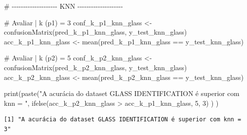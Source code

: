 \documentclass[
  letterpaper,
  DIV=11,
  numbers=noendperiod]{scrartcl}
\newenvironment{Shaded}{\begin{snugshade}}{\end{snugshade}}
\newcommand{\CommentTok}[1]{\textcolor[rgb]{0.37,0.37,0.37}{#1}}
\newcommand{\DecValTok}[1]{\textcolor[rgb]{0.68,0.00,0.00}{#1}}
\newcommand{\FunctionTok}[1]{\textcolor[rgb]{0.28,0.35,0.67}{#1}}
\newcommand{\NormalTok}[1]{\textcolor[rgb]{0.00,0.23,0.31}{#1}}
\newcommand{\OtherTok}[1]{\textcolor[rgb]{0.00,0.23,0.31}{#1}}
\newcommand{\SpecialCharTok}[1]{\textcolor[rgb]{0.37,0.37,0.37}{#1}}
\newcommand{\StringTok}[1]{\textcolor[rgb]{0.13,0.47,0.30}{#1}}
\begin{document}
\begin{Shaded}
\begin{Highlighting}[]
\CommentTok{\# {-}{-}{-}{-}{-}{-}{-}{-}{-}{-}{-}{-}{-}{-}{-}{-}{-}{-}{-}{-} KNN {-}{-}{-}{-}{-}{-}{-}{-}{-}{-}{-}{-}{-}{-}{-}{-}{-}{-}{-}{-}}

\CommentTok{\# Avaliar | k (p1) = 3}
\NormalTok{conf\_k\_p1\_knn\_glass }\OtherTok{\textless{}{-}} \FunctionTok{confusionMatrix}\NormalTok{(pred\_k\_p1\_knn\_glass, y\_test\_knn\_glass)}
\NormalTok{acc\_k\_p1\_knn\_glass  }\OtherTok{\textless{}{-}} \FunctionTok{mean}\NormalTok{(pred\_k\_p1\_knn\_glass }\SpecialCharTok{==}\NormalTok{ y\_test\_knn\_glass)}

\CommentTok{\# Avaliar | k (p2) = 5}
\NormalTok{conf\_k\_p2\_knn\_glass }\OtherTok{\textless{}{-}} \FunctionTok{confusionMatrix}\NormalTok{(pred\_k\_p2\_knn\_glass, y\_test\_knn\_glass)}
\NormalTok{acc\_k\_p2\_knn\_glass  }\OtherTok{\textless{}{-}} \FunctionTok{mean}\NormalTok{(pred\_k\_p2\_knn\_glass }\SpecialCharTok{==}\NormalTok{ y\_test\_knn\_glass)}

\FunctionTok{print}\NormalTok{(}\FunctionTok{paste}\NormalTok{(}\StringTok{"A acurácia do dataset GLASS IDENTIFICATION é superior com knn = "}\NormalTok{, }
            \FunctionTok{ifelse}\NormalTok{(acc\_k\_p2\_knn\_glass }\SpecialCharTok{\textgreater{}}\NormalTok{ acc\_k\_p1\_knn\_glass, }\DecValTok{5}\NormalTok{, }\DecValTok{3}\NormalTok{)}
\NormalTok{            )}
\NormalTok{      )}
\end{Highlighting}
\end{Shaded}

\begin{verbatim}
[1] "A acurácia do dataset GLASS IDENTIFICATION é superior com knn =  3"
\end{verbatim}
\end{document}
